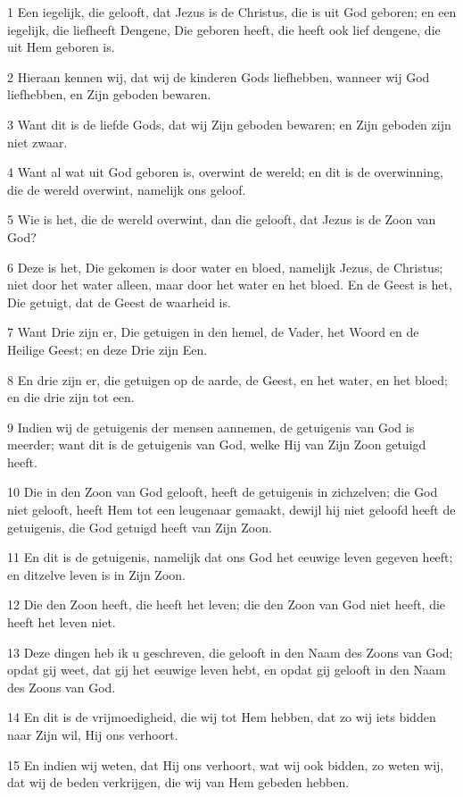 \par 1 Een iegelijk, die gelooft, dat Jezus is de Christus, die is uit God geboren; en een iegelijk, die liefheeft Dengene, Die geboren heeft, die heeft ook lief dengene, die uit Hem geboren is.
\par 2 Hieraan kennen wij, dat wij de kinderen Gods liefhebben, wanneer wij God liefhebben, en Zijn geboden bewaren.
\par 3 Want dit is de liefde Gods, dat wij Zijn geboden bewaren; en Zijn geboden zijn niet zwaar.
\par 4 Want al wat uit God geboren is, overwint de wereld; en dit is de overwinning, die de wereld overwint, namelijk ons geloof.
\par 5 Wie is het, die de wereld overwint, dan die gelooft, dat Jezus is de Zoon van God?
\par 6 Deze is het, Die gekomen is door water en bloed, namelijk Jezus, de Christus; niet door het water alleen, maar door het water en het bloed. En de Geest is het, Die getuigt, dat de Geest de waarheid is.
\par 7 Want Drie zijn er, Die getuigen in den hemel, de Vader, het Woord en de Heilige Geest; en deze Drie zijn Een.
\par 8 En drie zijn er, die getuigen op de aarde, de Geest, en het water, en het bloed; en die drie zijn tot een.
\par 9 Indien wij de getuigenis der mensen aannemen, de getuigenis van God is meerder; want dit is de getuigenis van God, welke Hij van Zijn Zoon getuigd heeft.
\par 10 Die in den Zoon van God gelooft, heeft de getuigenis in zichzelven; die God niet gelooft, heeft Hem tot een leugenaar gemaakt, dewijl hij niet geloofd heeft de getuigenis, die God getuigd heeft van Zijn Zoon.
\par 11 En dit is de getuigenis, namelijk dat ons God het eeuwige leven gegeven heeft; en ditzelve leven is in Zijn Zoon.
\par 12 Die den Zoon heeft, die heeft het leven; die den Zoon van God niet heeft, die heeft het leven niet.
\par 13 Deze dingen heb ik u geschreven, die gelooft in den Naam des Zoons van God; opdat gij weet, dat gij het eeuwige leven hebt, en opdat gij gelooft in den Naam des Zoons van God.
\par 14 En dit is de vrijmoedigheid, die wij tot Hem hebben, dat zo wij iets bidden naar Zijn wil, Hij ons verhoort.
\par 15 En indien wij weten, dat Hij ons verhoort, wat wij ook bidden, zo weten wij, dat wij de beden verkrijgen, die wij van Hem gebeden hebben.
